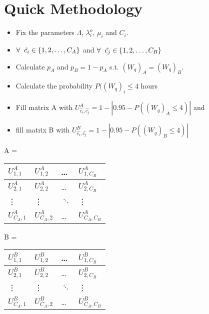 \documentclass{article}
\begin{document}
\newpage
\section{Quick Methodology}

\begin{itemize}
    \item Fix the parameters \( \Lambda \), \( \lambda_i^o \), \( \mu_i \) and \( C_i \). 
    \item \( \forall \hspace{0.2cm} \hat{c_i} \in \{1,2, \dots, C_A\} \) and \( \forall \hspace{0.2cm} \hat{c_j} \in \{1,2, \dots, C_B\} \) 
    \item Calculate \( p_A \) and \( p_B = 1-p_A \) s.t. \( (W_q)_A = (W_q)_B \). 
    \item Calculate the probability \(P((W_q)_i \leq 4 \) hours
    \item Fill matrix A with \( U_{\hat{c_i}, \hat{c_j}}^A = 1 - |0.95 - P((W_q)_A \leq 4)| \) and
    \item fill matrix B with \( U_{\hat{c_i}, \hat{c_j}}^B = 1 - |0.95 - P((W_q)_B \leq 4)| \)
\end{itemize}



\begin{table}[h]
    \centering
    A = 
    \begin{tabular}{|l|l|l|l|}
    \hline
    \( U_{1,1}^A \) & \( U_{1,2}^A \) & \dots & \( U_{1,C_B}^A \) \\ \hline
    \( U_{2,1}^A \) & \( U_{2,2}^A \) & \dots & \( U_{2,C_B}^A \) \\ \hline
    \vdots & \vdots & \( \ddots \) & \vdots \\ \hline
    \( U_{C_A,1}^A \) & \( U_{C_A,2}^A \) & \dots & \( U_{C_A,C_B}^A \) \\ \hline
    \end{tabular}
\end{table}  

\begin{table}[h]
    \centering
    B = 
    \begin{tabular}{|l|l|l|l|}
    \hline
    \( U_{1,1}^B \) & \( U_{1,2}^B \) & \dots & \( U_{1,C_B}^B \) \\ \hline
    \( U_{2,1}^B \) & \( U_{2,2}^B \) & \dots & \( U_{2,C_B}^B \) \\ \hline
    \vdots & \vdots & \( \ddots \) & \vdots \\ \hline
    \( U_{C_A,1}^B \) & \( U_{C_A,2}^B \) & \dots & \( U_{C_A,C_B}^B \) \\ \hline
    \end{tabular}
\end{table}  
\end{document}
